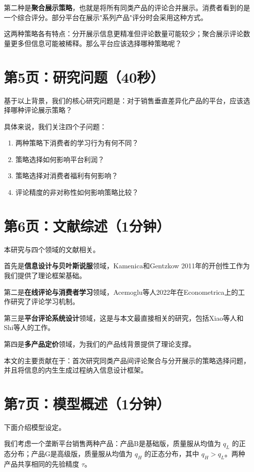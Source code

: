 \documentclass[12pt,a4paper]{article}
\begin{document}
第二种是\textbf{聚合展示策略}，也就是将所有同类产品的评论合并展示。消费者看到的是一个综合评分。部分平台在展示"系列产品"评分时会采用这种方式。

这两种策略各有特点：分开展示信息更精准但评论数量可能较少；聚合展示评论数量更多但信息可能被稀释。那么平台应该选择哪种策略呢？

\section*{第5页：研究问题（40秒）}

基于以上背景，我们的核心研究问题是：对于销售垂直差异化产品的平台，应该选择哪种评论展示策略？

具体来说，我们关注四个子问题：
\begin{enumerate}[itemsep=0pt]
    \item 两种策略下消费者的学习行为有何不同？
    \item 策略选择如何影响平台利润？
    \item 策略选择对消费者福利有何影响？
    \item 评论精度的非对称性如何影响策略比较？
\end{enumerate}

\section*{第6页：文献综述（1分钟）}

本研究与四个领域的文献相关。

首先是\textbf{信息设计与贝叶斯说服}领域，Kamenica和Gentzkow 2011年的开创性工作为我们提供了理论框架基础。

第二是\textbf{在线评论与消费者学习}领域，Acemoglu等人2022年在Econometrica上的工作研究了评论学习机制。

第三是\textbf{平台评论系统设计}领域，这是与本文最直接相关的研究，包括Xiao等人和Shi等人的工作。

第四是\textbf{多产品定价}领域，为我们的产品线背景提供了理论支撑。

本文的主要贡献在于：首次研究同类产品间评论聚合与分开展示的策略选择问题，并且将信息的内生生成过程纳入信息设计框架。

\section*{第7页：模型概述（1分钟）}

下面介绍模型设定。

我们考虑一个垄断平台销售两种产品：产品B是基础版，质量服从均值为 $q_L$ 的正态分布；产品G是高级版，质量服从均值为 $q_H$ 的正态分布，其中 $q_H > q_L$。两种产品共享相同的先验精度 $\tau$。
\end{document}

